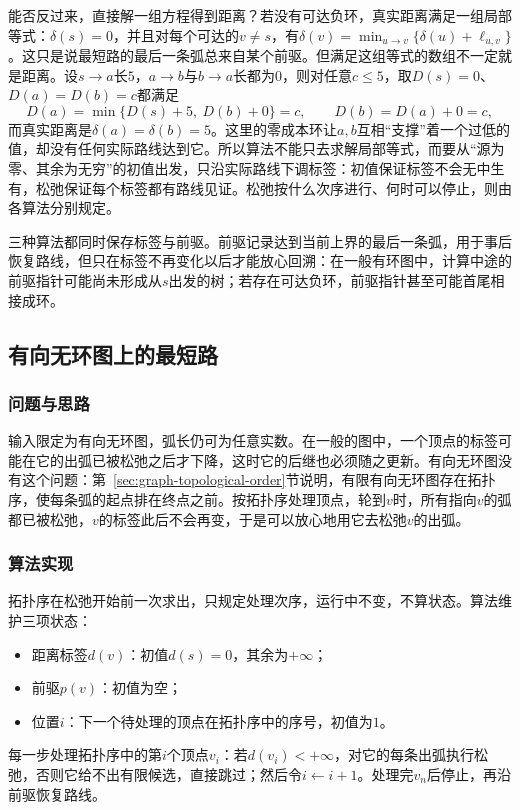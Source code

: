 能否反过来，直接解一组方程得到距离？若没有可达负环，真实距离满足一组局部等式：$\delta(s)=0$，并且对每个可达的$v\neq s$，有$\delta(v)=\min_{u\to v}\{\delta(u)+\ell_{u,v}\}$。这只是说最短路的最后一条弧总来自某个前驱。但满足这组等式的数组不一定就是距离。设$s\to a$长$5$，$a\to b$与$b\to a$长都为$0$，则对任意$c\leq5$，取$D(s)=0$、$D(a)=D(b)=c$都满足
\[
  D(a)=\min\{D(s)+5,\ D(b)+0\}=c,\qquad D(b)=D(a)+0=c,
\]
而真实距离是$\delta(a)=\delta(b)=5$。这里的零成本环让$a,b$互相“支撑”着一个过低的值，却没有任何实际路线达到它。所以算法不能只去求解局部等式，而要从“源为零、其余为无穷”的初值出发，只沿实际路线下调标签：初值保证标签不会无中生有，松弛保证每个标签都有路线见证。松弛按什么次序进行、何时可以停止，则由各算法分别规定。

三种算法都同时保存标签与前驱。前驱记录达到当前上界的最后一条弧，用于事后恢复路线，但只在标签不再变化以后才能放心回溯：在一般有环图中，计算中途的前驱指针可能尚未形成从$s$出发的树；若存在可达负环，前驱指针甚至可能首尾相接成环。

\subsection{有向无环图上的最短路}
\label{sec:graph-opt-dag-shortest-path}

\subsubsection{问题与思路}

输入限定为有向无环图，弧长仍可为任意实数。在一般的图中，一个顶点的标签可能在它的出弧已被松弛之后才下降，这时它的后继也必须随之更新。有向无环图没有这个问题：第~\ref{sec:graph-topological-order}节说明，有限有向无环图存在拓扑序，使每条弧的起点排在终点之前。按拓扑序处理顶点，轮到$v$时，所有指向$v$的弧都已被松弛，$v$的标签此后不会再变，于是可以放心地用它去松弛$v$的出弧。

\subsubsection{算法实现}

拓扑序在松弛开始前一次求出，只规定处理次序，运行中不变，不算状态。算法维护三项状态：
\begin{itemize}
  \item 距离标签$d(v)$：初值$d(s)=0$，其余为$+\infty$；
  \item 前驱$p(v)$：初值为空；
  \item 位置$i$：下一个待处理的顶点在拓扑序中的序号，初值为$1$。
\end{itemize}
每一步处理拓扑序中的第$i$个顶点$v_i$：若$d(v_i)<+\infty$，对它的每条出弧执行松弛，否则它给不出有限候选，直接跳过；然后令$i\gets i+1$。处理完$v_n$后停止，再沿前驱恢复路线。

